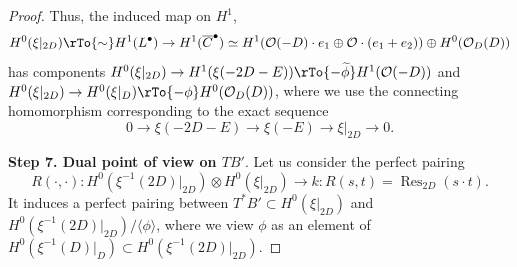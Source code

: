 \documentclass[reqno]{amsart}
\theoremstyle{definition}
\theoremstyle{remark}
\newcommand{\wt}{\widetilde}
\newcommand{\ot}{\otimes}
\newcommand{\OO}{{\mathcal O}}
\newcommand{\sub}{\subset}
\newcommand{\Res}{\operatorname{Res}}
\newcommand{\ov}{\overline}
\newcommand{\lan}{\langle}
\newcommand{\ran}{\rangle}
\numberwithin{equation}{section}
\begin{document}
\begin{proof}
Thus, the induced map on $H^1$,
$$H^0(\xi|_{2D})\rTo{\sim} H^1(L^\bullet)\to H^1(\ov{C}^\bullet)\simeq H^1(\OO(-D)\cdot e_1\oplus \OO\cdot (e_1+e_2))\oplus H^0(\OO_D(D))$$
has components $H^0(\xi|_{2D})\to H^1(\xi(-2D-E))\rTo{-\wt{\phi}} H^1(\OO(-D))$ and $H^0(\xi|_{2D})\to H^0(\xi|_D)\rTo{-\phi} H^0(\OO_D(D))$,
where we use the connecting homomorphism corresponding to the exact sequence
$$0\to \xi(-2D-E)\to \xi(-E)\to \xi|_{2D}\to 0.$$

\noindent
{\bf Step 7. Dual point of view on $TB'$}.
Let us consider the perfect pairing
$$R(\cdot,\cdot):H^0(\xi^{-1}(2D)|_{2D})\ot H^0(\xi|_{2D}) \to k: R(s,t)=\Res_{2D}(s\cdot t).$$
It induces a perfect pairing between $T^*B'\sub H^0(\xi|_{2D})$ and $H^0(\xi^{-1}(2D)|_{2D})/\lan \phi\ran$, where
we view $\phi$ as an element of $H^0(\xi^{-1}(D)|_D)\sub H^0(\xi^{-1}(2D)|_{2D})$.


\end{proof}
\end{document}
